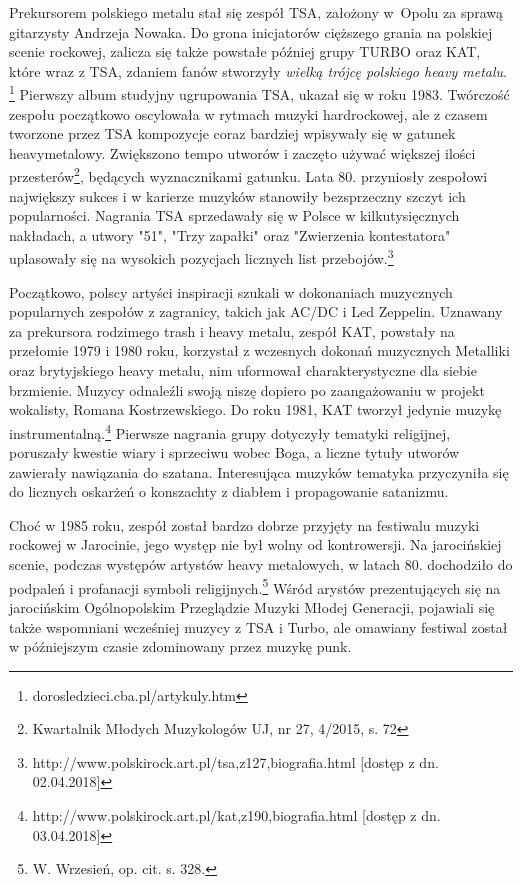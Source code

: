 \documentclass[12pt, a4paper, titlepage]{report}
\begin{document}
Prekursorem polskiego metalu stał się zespół TSA, założony w~Opolu za sprawą gitarzysty Andrzeja Nowaka. Do grona inicjatorów cięższego grania na polskiej scenie rockowej, zalicza się także powstałe później grupy TURBO oraz KAT, które wraz z TSA, zdaniem fanów stworzyły \textit{wielką trójcę polskiego heavy metalu}. \footnote{dorosledzieci.cba.pl/artykuly.htm} Pierwszy album studyjny ugrupowania TSA, ukazał się w roku 1983. Twórczość zespołu początkowo oscylowała w rytmach muzyki hardrockowej, ale z czasem tworzone przez TSA kompozycje coraz bardziej wpisywały się w gatunek heavymetalowy. Zwiększono tempo utworów i zaczęto używać większej ilości przesterów\footnote{Kwartalnik Młodych Muzykologów UJ, nr 27, 4/2015, s. 72}, będących wyznacznikami gatunku. Lata 80. przyniosły zespołowi największy sukces i w karierze muzyków stanowiły bezsprzeczny szczyt ich popularności. Nagrania TSA sprzedawały się w Polsce w kilkutysięcznych nakładach, a utwory "51", "Trzy zapałki" oraz "Zwierzenia kontestatora" uplasowały się na wysokich pozycjach licznych list przebojów.\footnote{http://www.polskirock.art.pl/tsa,z127,biografia.html [dostęp z dn. 02.04.2018]} 

Początkowo, polscy artyści inspiracji szukali w dokonaniach muzycznych popularnych zespołów z zagranicy, takich jak AC/DC i Led Zeppelin. Uznawany za prekursora rodzimego trash i heavy metalu, zespół KAT, powstały na przełomie 1979 i 1980 roku, korzystał z wczesnych dokonań muzycznych Metalliki oraz brytyjskiego heavy metalu, nim uformował charakterystyczne dla siebie brzmienie. Muzycy odnaleźli swoją niszę dopiero po zaangażowaniu w projekt wokalisty, Romana Kostrzewskiego. Do roku 1981, KAT tworzył jedynie muzykę instrumentalną.\footnote{http://www.polskirock.art.pl/kat,z190,biografia.html [dostęp z dn. 03.04.2018]} Pierwsze nagrania grupy dotyczyły tematyki religijnej, poruszały kwestie wiary i sprzeciwu wobec Boga, a liczne tytuły utworów zawierały nawiązania do szatana. Interesująca muzyków tematyka przyczyniła się do licznych oskarżeń o konszachty z diabłem i propagowanie satanizmu. 

Choć w 1985 roku, zespół został bardzo dobrze przyjęty na festiwalu muzyki rockowej w Jarocinie, jego występ nie był wolny od kontrowersji. Na jarocińskiej scenie, podczas występów artystów heavy metalowych, w latach 80. dochodziło do podpaleń i profanacji symboli religijnych.\footnote{W. Wrzesień, op. cit. s. 328.} Wśród arystów prezentujących się na jarocińskim Ogólnopolskim Przeglądzie Muzyki Młodej Generacji, pojawiali się także wspomniani wcześniej muzycy z TSA i Turbo, ale omawiany festiwal został w późniejszym czasie zdominowany przez muzykę punk. 
\end{document}

